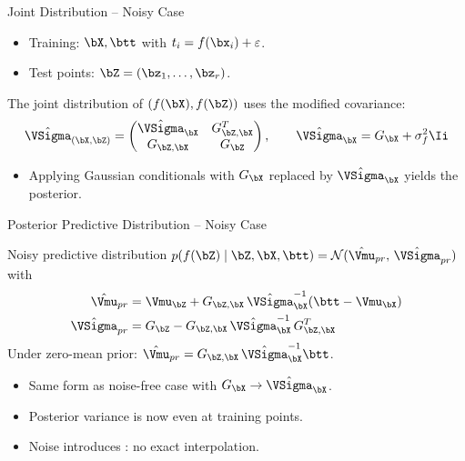 \begin{frame}{Joint Distribution -- Noisy Case}{}
  \begin{itemize}
    \item Training: $\bX,\btt$ with $t_i=f(\bx_i)+\varepsilon$.
    \item Test points: $\bZ=(\bz_1,\ldots,\bz_r)$.
  \end{itemize}

  \medskip
  The joint distribution of $(f(\bX),f(\bZ))$ uses the modified covariance:
  \[
    \hat{\VSigma}_{(\bX,\bZ)}=
    \begin{pmatrix}\hat{\VSigma}_{\bX} & G_{\bZ,\bX}^T \\ G_{\bZ,\bX} & G_{\bZ}\end{pmatrix},
    \qquad
    \hat{\VSigma}_{\bX}=G_{\bX}+\sigma_f^2\Ii
  \]

  \medskip
  \begin{itemize}
    \item Applying Gaussian conditionals with $G_{\bX}$ replaced by $\hat{\VSigma}_{\bX}$ yields the posterior.
  \end{itemize}
\end{frame}

\begin{frame}{Posterior Predictive Distribution -- Noisy Case}{}
  \begin{block}{Noisy predictive distribution}
    $p(f(\bZ)\mid\bZ,\bX,\btt)=\mathcal{N}(\hat{\Vmu}_{pr},\,\hat{\VSigma}_{pr})$ with
    \begin{align*}
      \hat{\Vmu}_{pr} &= \Vmu_{\bZ}+G_{\bZ,\bX}\,\hat{\VSigma}_{\bX}^{-1}(\btt-\Vmu_{\bX})\\
      \hat{\VSigma}_{pr} &= G_{\bZ}-G_{\bZ,\bX}\,\hat{\VSigma}_{\bX}^{-1}\,G_{\bZ,\bX}^T
    \end{align*}
    Under zero-mean prior: $\hat{\Vmu}_{pr}=G_{\bZ,\bX}\,\hat{\VSigma}_{\bX}^{-1}\btt$.
  \end{block}

  \medskip
  \begin{itemize}
    \item Same form as noise-free case with $G_{\bX}\to\hat{\VSigma}_{\bX}$.
    \item Posterior variance is now  even at training points.
    \item Noise introduces : no exact interpolation.
  \end{itemize}
\end{frame}

